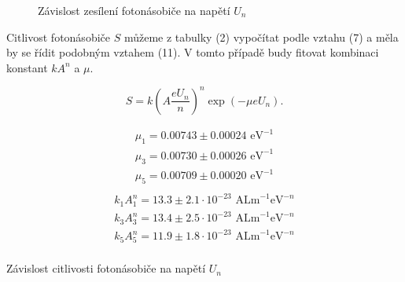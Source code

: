 \documentclass[a4paper,11pt]{article}
\begin{document}
\begin{figure}[htpb]
    \centering
    
    \caption{Závislost zesílení fotonásobiče na napětí $ U_n $}
\end{figure}

Citlivost fotonásobiče $ S $ můžeme z tabulky (2) vypočítat podle vztahu (7) a měla by se řídit podobným vztahem (11). V tomto případě budy fitovat kombinaci konstant $ k A^{n} $  a $ \mu $. 

\begin{equation}
S = k \left( A\frac{eU_n}{n} \right) ^{n}  \exp ( -\mu e U_n).
\end{equation}

\begin{table}[htpb]
    \begin{minipage}{.35\linewidth}
        \centering
        \begin{align*}
        \mu_1 = 0.00743 \pm 0.00024 \text{ eV}^{-1} \\
        \mu_3 = 0.00730 \pm 0.00026  \text{ eV}^{-1}\\
        \mu_5 = 0.00709 \pm 0.00020  \text{ eV}^{-1}\\
        \end{align*}
        \vspace{-30pt}
        \begin{align*}
            k_1 A_1^{n} = 13.3 \pm 2.1 \cdot 10^{-23} \text{ ALm}^{-1}\text{eV}^{-n}     \\
            k_3 A_3^{n}= 13.4 \pm 2.5  \cdot 10^{-23} \text{ ALm}^{-1}\text{eV}^{-n} \\
            k_5 A_5^{n} = 11.9 \pm 1.8   \cdot 10^{-23}\text{ ALm}^{-1}\text{eV}^{-n}\\
        \end{align*}
    \end{minipage} 
    \hfill
    \begin{minipage}{.60\linewidth}
        \centering
        
        \captionsetup{type=graph}
        \caption{Závislost citlivosti fotonásobiče na napětí $ U_n $ }
    \end{minipage} 
\end{table}



\end{document}
